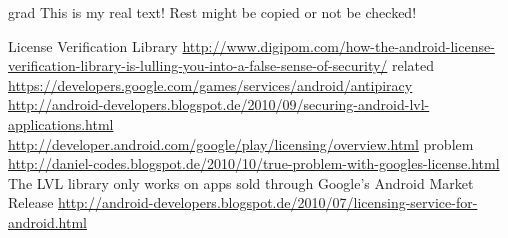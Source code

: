 grad%
This is my real text! Rest might be copied or not be checked!

License Verification Library\newline
\url{http://www.digipom.com/how-the-android-license-verification-library-is-lulling-you-into-a-false-sense-of-security/}\newline
related \url{https://developers.google.com/games/services/android/antipiracy}\newline
\url{http://android-developers.blogspot.de/2010/09/securing-android-lvl-applications.html}\newline
\url{http://developer.android.com/google/play/licensing/overview.html}\newline
problem \url{http://daniel-codes.blogspot.de/2010/10/true-problem-with-googles-license.html}\newline
The LVL library only works on apps sold through Google's Android Market
Release \url{http://android-developers.blogspot.de/2010/07/licensing-service-for-android.html}

